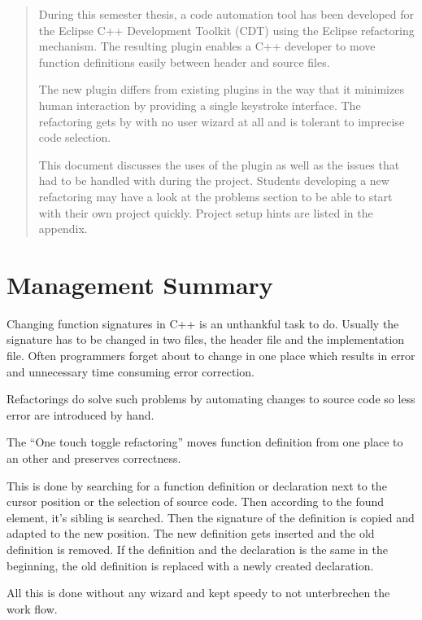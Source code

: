 \begin{abstract}
During this semester thesis, a code automation tool has been developed for the 
Eclipse C++ Development Toolkit (CDT) using the Eclipse refactoring mechanism. 
The resulting plugin enables a C++ developer to move function definitions easily 
between header and source files.

The new plugin differs from existing plugins in the way that it minimizes human 
interaction by providing a single keystroke interface. The refactoring gets by 
with no user wizard at all and is tolerant to imprecise code selection. 

This document discusses the uses of the plugin as well as the issues that had 
to be handled with during the project. Students developing a new refactoring may 
have a look at the problems section to be able to start with their own project 
quickly. Project setup hints are listed in the appendix.
\end{abstract}

\chapter*{Management Summary}
Changing function signatures in C++ is an unthankful task to do. Usually the
signature has to be changed in two files, the header file and the
implementation file. Often programmers forget about to change in one place
which results in error and unnecessary time consuming error correction.

Refactorings do solve such problems by automating changes to source code so
less error are introduced by hand.

The ``One touch toggle refactoring'' moves function definition from one place
to an other and preserves correctness.

This is done by searching for a function definition or declaration next to the
cursor position or the selection of source code. Then according to the found
element, it's sibling is searched. Then the signature of the definition is
copied and adapted to the new position. The new definition gets inserted and
the old definition is removed.
If the definition and the declaration is the same in the beginning, the old
definition is replaced with a newly created declaration.

All this is done without any wizard and kept speedy to not unterbrechen the
work flow.
\thispagestyle{empty}
\pagebreak

